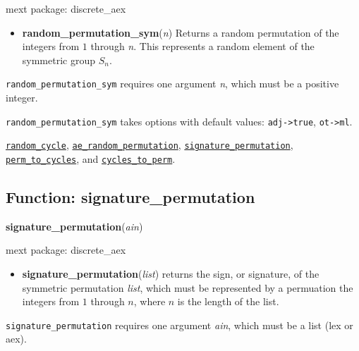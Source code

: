 \documentclass[]{article}
\begin{document}
\noindent mext package: discrete\_aex



\vspace{5 pt}
\begin{itemize}
\item[] {\bf random\_permutation\_sym}({\it n})
  Returns a random permutation of the integers from $1$ through {\it n}. This represents a random element of the symmetric group $S_n$. 

\end{itemize}
   {\tt random\_permutation\_sym} requires one argument {\it n}, which must be a positive integer.


\vspace{5 pt}

{\tt random\_permutation\_sym} takes options with default values: {\tt adj->true}, {\tt ot->ml}.
\vspace{5 pt}


  \hyperlink{random_cycle}{{\tt random\_cycle}}, \hyperlink{ae_random_permutation}{{\tt ae\_random\_permutation}}, \hyperlink{signature_permutation}{{\tt signature\_permutation}}, \hyperlink{perm_to_cycles}{{\tt perm\_to\_cycles}}, and \hyperlink{cycles_to_perm}{{\tt cycles\_to\_perm}}.

\vspace{5 pt}


\subsection{Function: signature\_permutation\label{sec:signature_permutation}}
\hypertarget{signature_permutation}{}
{\bf signature\_permutation}({\it ain})


\noindent mext package: discrete\_aex



\vspace{5 pt}
\begin{itemize}
\item[] {\bf signature\_permutation}({\it list})
  returns the sign, or signature, of the symmetric permutation {\it list}, which must be represented by a permuation the integers from $1$ through $n$, where $n$ is the length of the list. 

\end{itemize}
   {\tt signature\_permutation} requires one argument {\it ain}, which must be a list (lex or aex).
\end{document}
